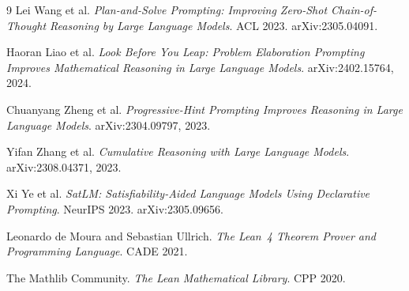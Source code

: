 \documentclass{llncs}
\begin{document}
\begin{thebibliography}{9}
Lei Wang et al.
\textit{Plan-and-Solve Prompting: Improving Zero-Shot Chain-of-Thought Reasoning by Large Language Models}.
ACL 2023. arXiv:2305.04091.

Haoran Liao et al.
\textit{Look Before You Leap: Problem Elaboration Prompting Improves Mathematical Reasoning in Large Language Models}.
arXiv:2402.15764, 2024.

Chuanyang Zheng et al.
\textit{Progressive-Hint Prompting Improves Reasoning in Large Language Models}.
arXiv:2304.09797, 2023.

Yifan Zhang et al.
\textit{Cumulative Reasoning with Large Language Models}.
arXiv:2308.04371, 2023.

Xi Ye et al.
\textit{SatLM: Satisfiability-Aided Language Models Using Declarative Prompting}.
NeurIPS 2023. arXiv:2305.09656.

Leonardo de Moura and Sebastian Ullrich.
\textit{The Lean~4 Theorem Prover and Programming Language}.
CADE 2021.

The Mathlib Community.
\textit{The Lean Mathematical Library}.
CPP 2020.

\end{thebibliography}
\end{document}
